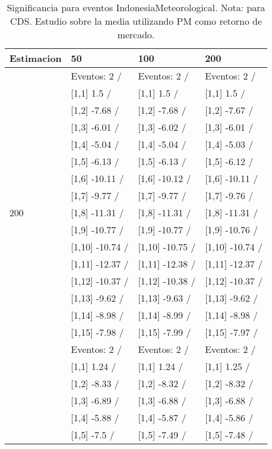 \begin{table}

\caption{Significancia para eventos IndonesiaMeteorological. Nota: para CDS. Estudio sobre la media utilizando PM como retorno de mercado.}
\centering
\begin{tabular}[t]{llll}
\toprule
Estimacion & 50 & 100 & 200\\
\midrule
 & Eventos:  2 / & Eventos:  2 / & Eventos:  2 /\\
 & {}[1,1] 1.5  / & {}[1,1] 1.5  / & {}[1,1] 1.5  /\\
 & {}[1,2] -7.68  / & {}[1,2] -7.68  / & {}[1,2] -7.67  /\\
 & {}[1,3] -6.01  / & {}[1,3] -6.02  / & {}[1,3] -6.01  /\\
 & {}[1,4] -5.04  / & {}[1,4] -5.04  / & {}[1,4] -5.03  /\\
\addlinespace
 & {}[1,5] -6.13  / & {}[1,5] -6.13  / & {}[1,5] -6.12  /\\
 & {}[1,6] -10.11  / & {}[1,6] -10.12  / & {}[1,6] -10.11  /\\
 & {}[1,7] -9.77  / & {}[1,7] -9.77  / & {}[1,7] -9.76  /\\
200 & {}[1,8] -11.31  / & {}[1,8] -11.31  / & {}[1,8] -11.31  /\\
 & {}[1,9] -10.77  / & {}[1,9] -10.77  / & {}[1,9] -10.76  /\\
\addlinespace
 & {}[1,10] -10.74  / & {}[1,10] -10.75  / & {}[1,10] -10.74  /\\
 & {}[1,11] -12.37  / & {}[1,11] -12.38  / & {}[1,11] -12.37  /\\
 & {}[1,12] -10.37  / & {}[1,12] -10.38  / & {}[1,12] -10.37  /\\
 & {}[1,13] -9.62  / & {}[1,13] -9.63  / & {}[1,13] -9.62  /\\
 & {}[1,14] -8.98  / & {}[1,14] -8.99  / & {}[1,14] -8.98  /\\
\addlinespace
 & {}[1,15] -7.98  / & {}[1,15] -7.99  / & {}[1,15] -7.97  /\\
 & Eventos:  2 / & Eventos:  2 / & Eventos:  2 /\\
 & {}[1,1] 1.24  / & {}[1,1] 1.24  / & {}[1,1] 1.25  /\\
 & {}[1,2] -8.33  / & {}[1,2] -8.32  / & {}[1,2] -8.32  /\\
 & {}[1,3] -6.89  / & {}[1,3] -6.88  / & {}[1,3] -6.88  /\\
\addlinespace
 & {}[1,4] -5.88  / & {}[1,4] -5.87  / & {}[1,4] -5.86  /\\
 & {}[1,5] -7.5  / & {}[1,5] -7.49  / & {}[1,5] -7.48  /\\

\end{tabular}
\end{table}
